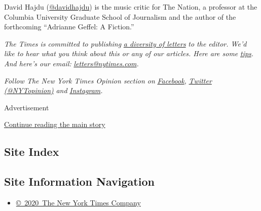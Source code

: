 David Hajdu (\href{https://twitter.com/davidhajdu_}{@davidhajdu}) is the
music critic for The Nation, a professor at the Columbia University
Graduate School of Journalism and the author of the forthcoming
``Adrianne Geffel: A Fiction.''

\emph{The Times is committed to publishing}
\href{https://www.nytimes.com/2019/01/31/opinion/letters/letters-to-editor-new-york-times-women.html}{\emph{a
diversity of letters}} \emph{to the editor. We'd like to hear what you
think about this or any of our articles. Here are some}
\href{https://help.nytimes.com/hc/en-us/articles/115014925288-How-to-submit-a-letter-to-the-editor}{\emph{tips}}\emph{.
And here's our email:}
\href{mailto:letters@nytimes.com}{\emph{letters@nytimes.com}}\emph{.}

\emph{Follow The New York Times Opinion section on}
\href{https://www.facebook.com/nytopinion}{\emph{Facebook}}\emph{,}
\href{http://twitter.com/NYTOpinion}{\emph{Twitter (@NYTopinion)}}
\emph{and}
\href{https://www.instagram.com/nytopinion/}{\emph{Instagram}}\emph{.}

Advertisement

\protect\hyperlink{after-bottom}{Continue reading the main story}

\hypertarget{site-index}{%
\subsection{Site Index}\label{site-index}}

\hypertarget{site-information-navigation}{%
\subsection{Site Information
Navigation}\label{site-information-navigation}}

\begin{itemize}
\tightlist
\item
  \href{https://help.nytimes.com/hc/en-us/articles/115014792127-Copyright-notice}{©~2020~The
  New York Times Company}
\end{itemize}

